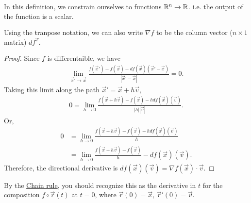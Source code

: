 \begin{remark}
In this definition, we constrain ourselves to functions $\mathbb{R}^n\to\mathbb{R}$. i.e. the output of the function is a scalar.
\end{remark}
\begin{remark}
    Using the tranpose notation, we can also write $\nabla f$ to be the column vector ($n\times 1$ matrix) $df^T$. 
\end{remark}


\begin{proof}
    Since $f$ is differentaible, we have \begin{align*}
        \lim_{\vec{x}'\to\vec{x}}\frac{f(\vec{x}')-f(\vec{x})-df(\vec{x})(\vec{x}'-\vec{x})}{|\vec{x}'-\vec{x}|}=0.
    \end{align*}
    Taking this limit along the path $\vec{x}'=\vec{x}+h\vec{v}$,\begin{align*}
        0=\lim_{h\to 0}\frac{f(\vec{x}+h\vec{v})-f(\vec{x})-hdf(\vec{x})(\vec{v})}{|h||\vec{v}|}.
    \end{align*}
    Or, 
    \begin{align*}
        0&=\lim_{h\to 0}\frac{f(\vec{x}+h\vec{v})-f(\vec{x})-hdf(\vec{x})(\vec{v})}{h}\\
        &=\lim_{h\to 0}\frac{f(\vec{x}+h\vec{v})-f(\vec{x})}{h} - df(\vec{x})(\vec{v}).
    \end{align*}
    Therefore, the directional derivative is $df(\vec{x})(\vec{v}) = \nabla f(\vec{x})\cdot \vec{v}$.
\end{proof}
By the \hyperref[thm:chainrule]{Chain rule}, you should recognize this as the derivative in $t$ for the composition $f\circ \vec{r}(t)$ at $t=0$,
where $\vec{r}(0)=\vec{x}$, $\vec{r}'(0)=\vec{v}$.

